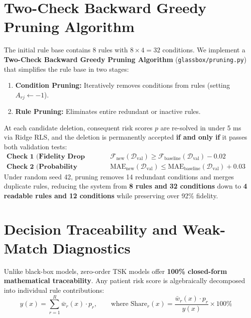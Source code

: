 \documentclass{report}
\begin{document}
\section{Two-Check Backward Greedy Pruning Algorithm}

The initial rule base contains 8 rules with $8 \times 4 = 32$ conditions. We implement a \textbf{Two-Check Backward Greedy Pruning Algorithm} (\texttt{glassbox/pruning.py}) that simplifies the rule base in two stages:
\begin{enumerate}
    \setlength{\itemsep}{0pt}
    \setlength{\parskip}{0pt}
    \item \textbf{Condition Pruning:} Iteratively removes conditions from rules (setting $A_{rj} \leftarrow -1$).
    \item \textbf{Rule Pruning:} Eliminates entire redundant or inactive rules.
\end{enumerate}
At each candidate deletion, consequent risk scores $p$ are re-solved in under 5 ms via Ridge RLS, and the deletion is permanently accepted \textbf{if and only if} it passes both validation tests:
\begin{align}
    \textbf{Check 1 (Fidelity Drop Check):} & \quad \mathcal{F}_{\text{new}}(\mathcal{D}_{\text{val}}) \ge \mathcal{F}_{\text{baseline}}(\mathcal{D}_{\text{val}}) - 0.02 \\
    \textbf{Check 2 (Probability Error Check):} & \quad \text{MAE}_{\text{new}}(\mathcal{D}_{\text{val}}) \le \text{MAE}_{\text{baseline}}(\mathcal{D}_{\text{val}}) + 0.03
\end{align}
Under random seed 42, pruning removes 14 redundant conditions and merges duplicate rules, reducing the system from \textbf{8 rules and 32 conditions} down to \textbf{4 readable rules and 12 conditions} while preserving over 92\% fidelity.

\section{Decision Traceability and Weak-Match Diagnostics}

Unlike black-box models, zero-order TSK models offer \textbf{100\% closed-form mathematical traceability}. Any patient risk score is algebraically decomposed into individual rule contributions:
\begin{equation}
    y(x) = \sum_{r=1}^R \bar{w}_r(x) \cdot p_r, \qquad \text{where } \text{Share}_r(x) = \frac{\bar{w}_r(x) \cdot p_r}{y(x)} \times 100\%
\end{equation}
\end{document}
